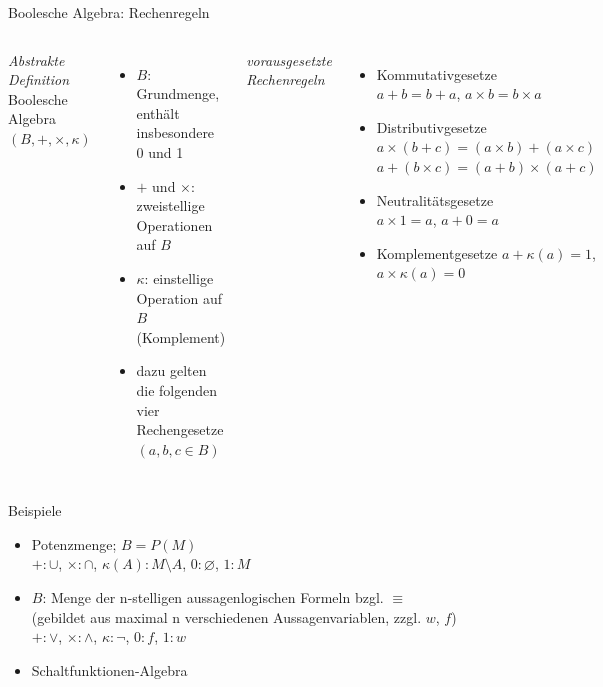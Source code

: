 \begin{frame}{Boolesche Algebra: Rechenregeln}
	\begin{columns}
		\emph{Abstrakte Definition}\\
		Boolesche Algebra $(B, +, \times, \kappa)$
		\begin{itemize}
			\item $B$: Grundmenge, enthält insbesondere 0 und 1
			\item $+$ und $\times$: zweistellige Operationen auf $B$
			\item $\kappa$: einstellige Operation auf $B$ (Komplement)
			\item dazu gelten die folgenden vier Rechengesetze $(a,b,c\in B)$
		\end{itemize}
		\emph{vorausgesetzte Rechenregeln}\\
		\begin{itemize}
			\item Kommutativgesetze\\
				$a+b=b+a$, $a \times b=b \times a$
			\item Distributivgesetze\\
				$a \times (b + c) = (a \times b) + (a\times c)$\\
				$a + (b \times c) = (a + b) \times (a + c)$\\
			\item Neutralitätsgesetze\\
				$a \times 1 = a$, $a + 0 = a$
			\item Komplementgesetze
				$a + \kappa(a) = 1$, $a \times \kappa(a) = 0$
		\end{itemize}
	\end{columns}		
\end{frame}


\begin{frame}{Beispiele}
	\begin{itemize}
		\item Potenzmenge; $B=P(M)$\\
			$+:\cup$, $\times:\cap$, $\kappa(A):M\setminus A$, $0:\varnothing$, $1:M$
		\item $B$: Menge der n-stelligen aussagenlogischen Formeln bzgl. $\equiv$\\
			(gebildet aus maximal n verschiedenen Aussagenvariablen, zzgl. $w$, $f$)\\
			$+:\lor$, $\times:\land$, $\kappa:\neg$, $0:f$, $1:w$
		\item Schaltfunktionen-Algebra
	\end{itemize}
\end{frame}

